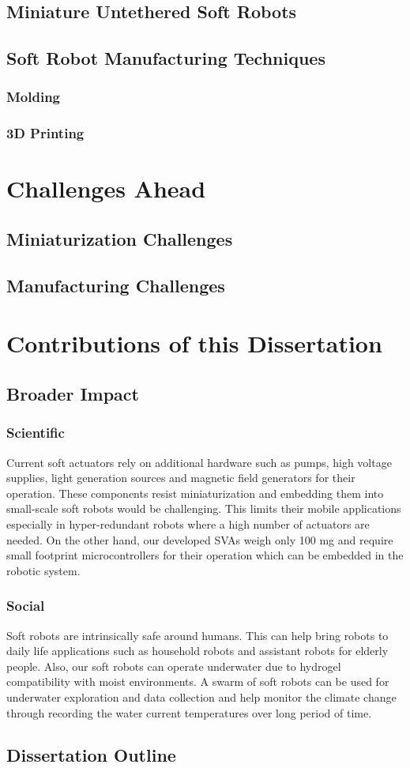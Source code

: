 \subsection{Miniature Untethered Soft Robots}
\subsection{Soft Robot Manufacturing Techniques}
\subsubsection{Molding}
\subsubsection{3D Printing}
\section{Challenges Ahead}
\subsection{Miniaturization Challenges}
\subsection{Manufacturing Challenges}
\section{Contributions of this Dissertation}
\subsection{Broader Impact}
\subsubsection{Scientific}
Current soft actuators rely on additional hardware such as pumps, high voltage supplies, light generation sources and magnetic field generators for their operation. These components resist miniaturization and embedding them into small-scale soft robots would be challenging. This limits their mobile applications especially in hyper-redundant robots where a high number of actuators are needed. On the other hand, our developed SVAs weigh only 100 mg and require small footprint microcontrollers for their operation which can be embedded in the robotic system. 
\subsubsection{Social}
Soft robots are intrinsically safe around humans. This can help bring robots to daily life applications such as household robots and assistant robots for elderly people. Also, our soft robots can operate underwater due to hydrogel compatibility with moist environments. A swarm of soft robots can be used for underwater exploration and data collection and help monitor the climate change through recording the water current temperatures over long period of time.

\subsection{Dissertation Outline}



